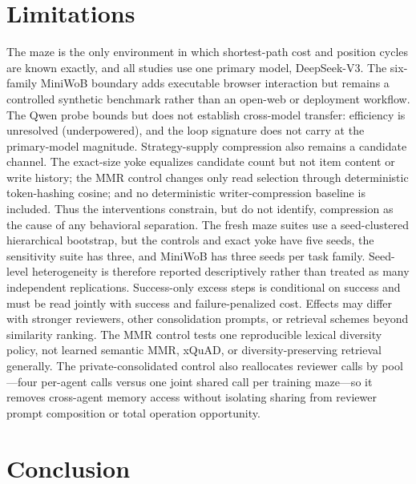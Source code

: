 \documentclass[letterpaper]{article} %
\begin{document}
\section{Limitations}

The maze is the only environment in which shortest-path cost and position cycles are known
exactly, and all studies use one primary model, DeepSeek-V3. The six-family MiniWoB boundary
adds executable browser interaction but remains a controlled synthetic benchmark rather than
an open-web or deployment workflow. The Qwen probe bounds but does not establish cross-model
transfer: efficiency is unresolved (underpowered), and the loop signature does not carry at
the primary-model magnitude. Strategy-supply compression also remains a candidate channel.
The exact-size yoke equalizes candidate count but not item content or write history; the MMR
control changes only read selection through deterministic token-hashing cosine; and no
deterministic writer-compression baseline is included. Thus the interventions constrain, but
do not identify, compression as the cause of any behavioral separation. The fresh maze suites
use a seed-clustered hierarchical bootstrap, but the controls and exact yoke have five seeds,
the sensitivity suite has three, and MiniWoB has three seeds per task family. Seed-level
heterogeneity is therefore reported descriptively rather than treated as many independent
replications. Success-only excess steps is conditional on success and must be read jointly
with success and failure-penalized cost. Effects may differ with stronger reviewers, other
consolidation prompts, or retrieval schemes beyond similarity ranking. The MMR control tests
one reproducible lexical diversity policy, not learned semantic MMR, xQuAD, or
diversity-preserving retrieval generally. The private-consolidated control also reallocates
reviewer calls by pool---four per-agent calls versus one joint shared call per training
maze---so it removes cross-agent memory access without isolating sharing from reviewer prompt
composition or total operation opportunity.

\section{Conclusion}
\end{document}
